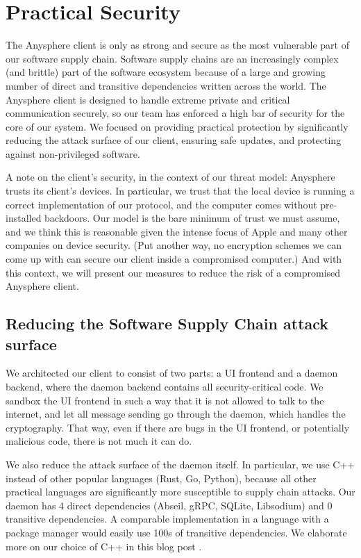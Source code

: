 \section{Practical Security}

The Anysphere client is only as strong and secure as the most vulnerable part of our software supply chain. Software supply chains are an increasingly complex (and brittle) part of the software ecosystem because of a large and growing number of direct and transitive dependencies written across the world. 
The Anysphere client is designed to handle extreme private and critical communication securely, so our team has enforced a high bar of security for the core of our system. We focused on providing practical protection by significantly reducing the attack surface of our client, ensuring safe updates, and protecting against non-privileged software. 

A note on the client's security, in the context of our threat model: Anysphere trusts its client's devices. 
In particular, we trust that the local device is running a correct implementation of our protocol, and the computer comes without pre-installed backdoors. 
Our model is the bare minimum of trust we must assume, and we think this is reasonable given the intense focus of Apple and many other companies on device security. 
(Put another way, no encryption schemes we can come up with can secure our client inside a compromised computer.)
And with this context, we will present our measures to reduce the risk of a compromised Anysphere client.

\subsection{Reducing the Software Supply Chain attack surface}
We architected our client to consist of two parts: a UI frontend and a daemon backend, where the daemon backend contains all security-critical code. We sandbox the UI frontend in such a way that it is not allowed to talk to the internet, and let all message sending go through the daemon, which handles the cryptography. That way, even if there are bugs in the UI frontend, or potentially malicious code, there is not much it can do.


We also reduce the attack surface of the daemon itself. In particular, we use C++ instead of other popular languages (Rust, Go, Python), because all other practical languages are significantly more susceptible to supply chain attacks. Our daemon has 4 direct dependencies (Abseil, gRPC, SQLite, Libsodium) and 0 transitive dependencies. A comparable implementation in a language with a package manager would easily use 100s of transitive dependencies. We elaborate more on our choice of C++ in this blog post .

